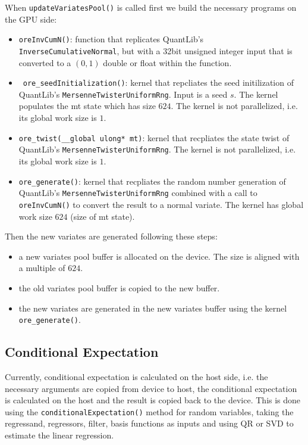 \documentclass[12pt, a4paper]{article}
\begin{document}
When \verb+updateVariatesPool()+ is called first we build the necessary programs on the GPU side:

\begin{itemize}
\item \verb+oreInvCumN()+: function that replicates QuantLib's \verb+InverseCumulativeNormal+, but with a 32bit unsigned
  integer input that is converted to a $(0,1)$ double or float within the function.
\item \verb+ore_seedInitialization()+: kernel that repcliates the seed initilization of QuantLib's
  \verb+MersenneTwisterUniformRng+. Input is a seed $s$. The kernel populates the mt state which has size $624$. The
  kernel is not parallelized, i.e. its global work size is $1$.
\item \verb+ore_twist(__global ulong* mt)+: kernel that recpliates the state twist of QuantLib's
  \verb+MersenneTwisterUniformRng+. The kernel is not parallelized, i.e. its global work size is $1$.
\item \verb+ore_generate()+: kernel that recpliates the random number generation of QuantLib's
  \verb+MersenneTwisterUniformRng+ combined with a call to \verb+oreInvCumN()+ to convert the result to a normal
  variate. The kernel has global work size $624$ (size of mt state).
\end{itemize}

Then the new variates are generated following these steps:

\begin{itemize}
\item a new variates pool buffer is allocated on the device. The size is aligned with a multiple of $624$.
\item the old variates pool buffer is copied to the new buffer.
\item the new variates are generated in the new variates buffer using the kernel \verb+ore_generate()+.
\end{itemize}

\subsection{Conditional Expectation}

Currently, conditional expectation is calculated on the host side, i.e. the necessary arguments are copied from device
to host, the conditional expectation is calculated on the host and the result is copied back to the device. This is done
using the \verb+conditionalExpectation()+ method for random variables, taking the regressand, regressors, filter, basis
functions as inputs and using QR or SVD to estimate the linear regression.
\end{document}
